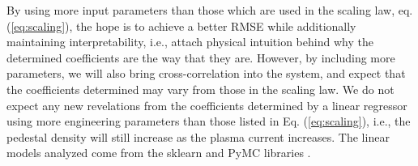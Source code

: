 \documentclass[a4paper, twoside, final, 12pt]{article}
\begin{document}

By using more input parameters than those which are used in the scaling law, eq. (\ref{eq:scaling}), the hope is to achieve a better RMSE while additionally maintaining interpretability, i.e., attach physical intuition behind why the determined coefficients are the way that they are. However, by including more parameters, we will also bring cross-correlation into the system, and expect that the coefficients determined may vary from those in the scaling law. We do not expect any new revelations from the coefficients determined by a linear regressor using more engineering parameters than those listed in Eq. (\ref{eq:scaling}), i.e., the pedestal density will still increase as the plasma current increases.  The linear models analyzed come from the sklearn and PyMC libraries \cite{scikit-learn, Salvatier2016}. 
\end{document}
